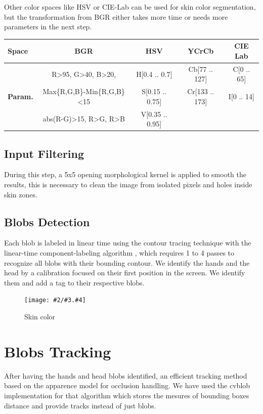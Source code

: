 \documentclass{llncs}
\newcommand{\imagepathext}[5]{%
\begin{figure}[!htbp]
\hfil\texttt{[image: \#2/\#3.\#4]}\hfil
\caption{#5\label{#3}}
\end{figure}}
\newcommand{\png}[2]{\imagepathext{width=\columnwidth}{pics}{#1}{png}{#2}}
\begin{document}
Other color spaces like HSV or CIE-Lab can be used for skin color segmentation,
but the transformation from BGR either takes more time or needs more parameters
in the next step.

\begin{center}
\begin{tabular}{|l|c|c|c|c|}
\hline
\textbf{Space} & BGR & HSV & YCrCb & CIE Lab\\
\hline
 & R\textgreater 95, G\textgreater 40, B\textgreater 20, & H[0.4 .. 0.7] & Cb[77 .. 127] & C[0 .. 65] \\
\textbf{Param.} & Max\{R,G,B\}-Min\{R,G,B\}\textless 15 & S[0.15 .. 0.75] & Cr[133 .. 173] & I[0 .. 14] \\
 & abs(R-G)\textgreater 15, R\textgreater G, R\textgreater B & V[0.35 .. 0.95] & & \\
\hline
\end{tabular}
\end{center}

\subsection{Input Filtering}
During this step, a 5x5 opening morphological kernel \cite{morphologicalAnalysis} is applied to smooth the results,
this is necessary to clean the image from isolated pixels and holes inside skin
zones.

\subsection{Blobs Detection}
Each blob is labeled in linear time using the contour tracing technique with
the linear-time component-labeling algorithm \cite{CompLabeling},
which requires 1 to 4 passes to recognize all blobs with their bounding contour.
We identify the hands and the head by a calibration focused on their first
position in the screen. We identify them and add a tag to their respective blobs.

\png{skincolor}{Skin color}
\section{Blobs Tracking}
After having the hands and head blobs identified, an efficient
tracking method based on the apparence model for occlusion handling\cite{app06}.
We have used the cvblob implementation \cite{cvblob} for that algorithm which 
stores the mesures of bounding boxes distance and provide tracks instead of just blobs.  %
\end{document}
